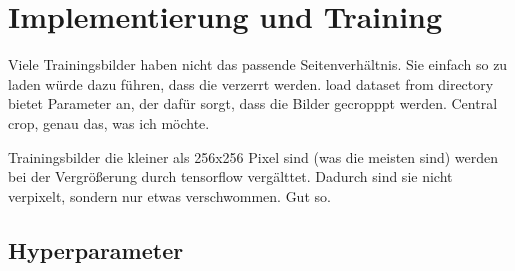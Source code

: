\chapter{Implementierung und Training}
Viele Trainingsbilder haben nicht das passende Seitenverhältnis. Sie einfach so zu laden würde dazu führen, dass die verzerrt werden. load dataset from directory bietet Parameter an, der dafür sorgt, dass die Bilder gecropppt werden. Central crop, genau das, was ich möchte.

Trainingsbilder die kleiner als 256x256 Pixel sind (was die meisten sind) werden bei der Vergrößerung durch tensorflow vergälttet. Dadurch sind sie nicht verpixelt, sondern nur etwas verschwommen. Gut so.
\section{Hyperparameter}